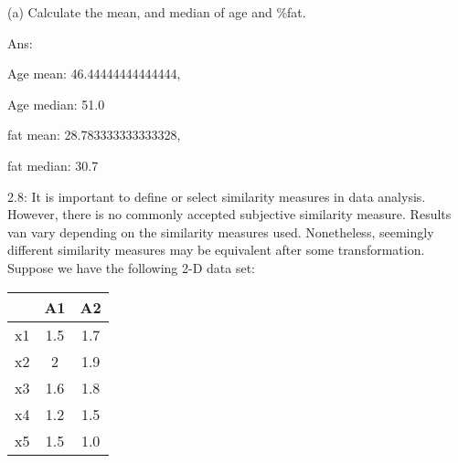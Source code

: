 	\begin{description}


		\item (a) Calculate the mean, and median of age and \%fat.

		\vspace{0.5\baselineskip}

		Ans:

		\begin{description}


			\item Age mean: 46.44444444444444,
			\item Age median: 51.0

			\vspace{0.5\baselineskip}

			\item fat mean: 28.783333333333328,
			\item fat median: 30.7
		
		\end{description}
	
	\end{description}

	\vspace{0.5\baselineskip}

	\clearpage

	2.8: It is important to define or select similarity measures in data analysis.
	However, there is no commonly accepted subjective similarity measure.
	Results van vary depending on the similarity measures used.
	Nonetheless, seemingly different similarity measures may be equivalent after some transformation.
	Suppose we have the following 2-D data set:

	\vspace{0.5\baselineskip}

	\begin{center}
	\begin{tabular}{||c c c||} 
	\hline
	  & A1 & A2 \\ [0.5ex] 
	\hline\hline
	x1 & 1.5 & 1.7 \\ 
	\hline
	x2 & 2 & 1.9 \\
	\hline
	x3 & 1.6 & 1.8 \\
	\hline
	x4 & 1.2 & 1.5 \\
	\hline
	x5 & 1.5 & 1.0 \\ [1ex] 
	\hline
	\end{tabular}
	\end{center}

